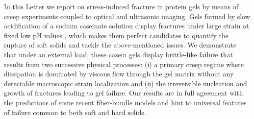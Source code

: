 \documentclass[twocolumn,superscriptaddress,showpacs,preprintnumbers,amsmath,amssymb,prl]{revtex4}
\begin{document}
In this Letter we report on stress-induced fracture in protein gels by means of creep experiments coupled to optical and ultrasonic imaging. Gels formed by slow acidification of a sodium caseinate solution display fractures under large strain at fixed low pH values \cite{vanVliet:1995,Lucey:1998}, which makes them perfect candidates to quantify the rupture of soft solids and tackle the above-mentioned issues. We demonstrate that under an external load, these casein gels display brittle-like failure that results from two successive physical processes: (i) a primary creep regime where dissipation is dominated by viscous flow through the gel matrix without any detectable macroscopic strain localization and (ii) the irreversible nucleation and growth of fractures leading to gel failure. Our results are in full agreement with the predictions of some recent fiber-bundle models and hint to universal features of failure common to both soft and hard solids.
\end{document}
